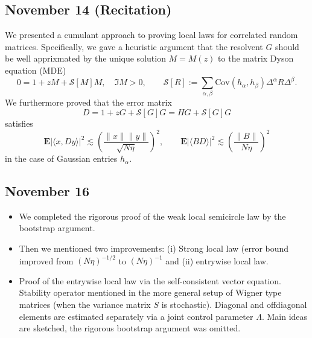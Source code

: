 \documentclass[a4paper]{article}
\begin{document}
\subsection{November 14 (Recitation)%
  \label{november-14-recitation}%
}

We presented a cumulant approach to proving local laws for correlated random matrices. Specifically, we gave a heuristic argument that the resolvent $G$ should be well apprixmated by the unique solution $M=M(z)$ to the matrix Dyson equation (MDE)
%
\begin{equation*}

0=1+zM+\mathcal S[M]M, \quad \Im M>0,\qquad \mathcal S[R]:= \sum_{\alpha,\beta}\text{Cov}(h_\alpha,h_\beta) \Delta^\alpha R\Delta^\beta.

\end{equation*}
We furthermore proved that the error matrix
%
\begin{equation*}

D=1+zG+\mathcal S[G]G=HG+\mathcal S[G]G

\end{equation*}
satisfies
%
\begin{equation*}

\mathbf E\lvert\langle x,Dy \rangle\rvert^2 \lesssim \left(\frac{\lVert x\rVert \lVert y\rVert}{\sqrt{N\eta}}\right)^2,\qquad \mathbf E\lvert\langle BD \rangle\rvert^2 \lesssim \left(\frac{\lVert B\rVert}{N\eta}\right)^2

\end{equation*}
in the case of Gaussian entries $h_\alpha$.


\subsection{November 16%
  \label{november-16}%
}

\begin{itemize}
\item We completed the rigorous proof of the weak local semicircle law
by the bootstrap argument.

\item Then we mentioned two improvements: (i) Strong local law (error bound improved from $(N \eta)^{-1/2}$ to $(N\eta)^{-1}$ and (ii) entrywise local law.

\item Proof of the entrywise local law via the self-consistent vector equation. Stability operator mentioned in the more general setup of Wigner type matrices (when the variance matrix $S$ is stochastic). Diagonal and offdiagonal elements are estimated separately via a joint control parameter $\Lambda$. Main ideas are sketched, the rigorous bootstrap argument was omitted.
\end{itemize}
\end{document}
